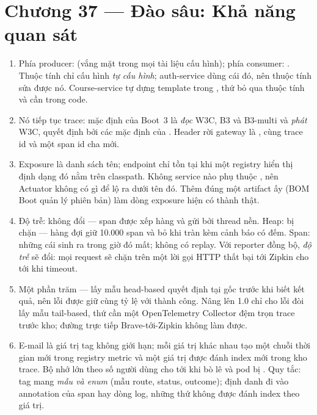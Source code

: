 \section*{Chương 37 --- Đào sâu: Khả năng quan sát}
\begin{enumerate}
  \item Phía producer:
  (vắng mặt trong mọi tài liệu cấu hình); phía consumer:
  .
  Thuộc tính chỉ cấu
  hình  \emph{tự cấu hình}; auth-service dùng cái
  đó, nên thuộc tính sửa được nó. Course-service tự dựng template trong
  , thứ bỏ qua thuộc tính và cần
   trong code.
  \item Nó tiếp tục trace: mặc định của Boot~3 là \emph{đọc} W3C, B3
  và B3-multi và \emph{phát} W3C, quyết định bởi các mặc định của
  . Header rời gateway là
  , cùng trace id và một span id cha mới.
  \item Exposure là danh sách tên; endpoint chỉ tồn tại khi một
  registry hiển thị định dạng đó nằm trên classpath. Không service nào
  phụ thuộc , nên Actuator không
  có gì để lộ ra dưới tên đó. Thêm đúng một artifact ấy (BOM Boot quản
  lý phiên bản) làm dòng exposure hiện có thành thật.
  \item Độ trễ: không đổi --- span được xếp hàng và gửi bởi thread nền.
  Heap: bị chặn --- hàng đợi giữ 10.000 span và bỏ khi tràn kèm cảnh
  báo có đếm. Span: những cái sinh ra trong giờ đó mất; không có
  replay. Với reporter đồng bộ, \emph{độ trễ} sẽ đổi: mọi request sẽ
  chặn trên một lời gọi HTTP thất bại tới Zipkin cho tới khi timeout.
  \item Một phần trăm --- lấy mẫu head-based quyết định tại gốc trước
  khi biết kết quả, nên lỗi được giữ cùng tỷ lệ với thành công. Nâng
  lên 1.0 chỉ cho lỗi đòi lấy mẫu tail-based, thứ cần một OpenTelemetry
  Collector đệm trọn trace trước kho; đường trực tiếp Brave-tới-Zipkin
  không làm được.
  \item E-mail là giá trị tag không giới hạn; mỗi giá trị khác nhau tạo
  một chuỗi thời gian mới trong registry metric và một giá trị được
  đánh index mới trong kho trace. Bộ nhớ lớn theo số người dùng cho tới
  khi  bò lê và pod bị . Quy
  tắc: tag mang \emph{mẫu và enum} (mẫu route, status, outcome); định
  danh đi vào annotation của span hay dòng log, những thứ không được
  đánh index theo giá trị.
\end{enumerate}

